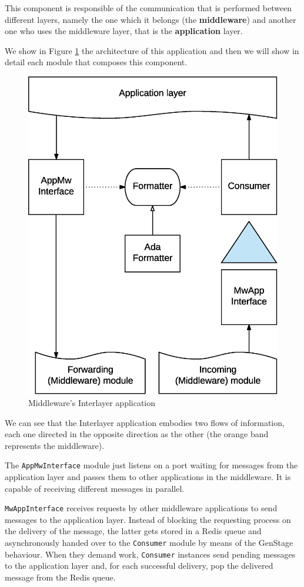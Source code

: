 
This component is responsible of the communication that is performed between
different layers, namely the one which it belongs (the \textbf{middleware}) and
another one who uses the middleware layer, that is the \textbf{application}
layer.

We show in Figure \ref{fig:mw-interlayer} the architecture of this application and
then we will show in detail each module that composes this component.

\begin{figure}[H]
  \centering
  \includegraphics[width=.8\columnwidth]{images/solution/mw/int/architect.eps}
  \caption{Middleware's Interlayer application}
  \label{fig:mw-interlayer}
\end{figure}

We can see that the Interlayer application embodies two flows of information, each
one directed in the opposite direction as the other (the orange band represents
the middleware).

The \texttt{AppMwInterface} module just listens on a port waiting for messages
from the application layer and passes them to other applications in the middleware.
It is capable of receiving different messages in parallel.

\texttt{MwAppInterface} receives requests by other middleware applications to send
messages to the application layer. Instead of blocking the requesting process
on the delivery of the message, the latter gets stored in a Redis queue and
asynchronously handed over to the \texttt{Consumer} module by means of the
GenStage behaviour. When they demand work, \texttt{Consumer} instances send
pending messages to the application layer and, for each successful delivery,
pop the delivered message from the Redis queue.

